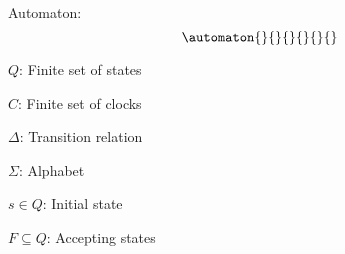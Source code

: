 \begin{definition}\label{definition:automatonDefinition}
    \cite*{Eugene2001}
    Automaton:
    $$\automaton{}{}{}{}{}{}$$

    $Q$: Finite set of states

    $C$: Finite set of clocks

    $\Delta$: Transition relation

    $\Sigma$: Alphabet

    $s\in Q$: Initial state

    $F\subseteq Q$: Accepting states
\end{definition}